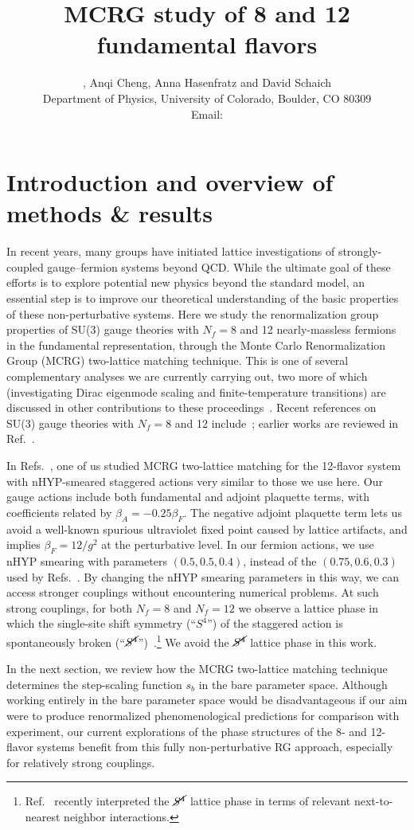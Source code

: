 \documentclass{PoS}
\title{MCRG study of 8 and 12 fundamental flavors}
\author{\speaker{Gregory Petropoulos}, Anqi Cheng, Anna Hasenfratz and David Schaich \\
  Department of Physics, University of Colorado, Boulder, CO 80309 \\
  Email: \email{gregory.petropoulos@colorado.edu}
}
\newcommand{\be}{\ensuremath{\beta} }
\newcommand{\Sb}{\ensuremath{\cancel{S^4}} }
\newcommand{\refcite}[1]{Ref.~\cite{#1}}
\begin{document}
\section{Introduction and overview of methods \& results} %
In recent years, many groups have initiated lattice investigations of strongly-coupled gauge--fermion systems beyond QCD.
While the ultimate goal of these efforts is to explore potential new physics beyond the standard model, an essential step is to improve our theoretical understanding of the basic properties of these non-perturbative systems.
Here we study the renormalization group properties of SU(3) gauge theories with $N_f = 8$ and 12 nearly-massless fermions in the fundamental representation, through the Monte Carlo Renormalization Group (MCRG) two-lattice matching technique.
This is one of several complementary analyses we are currently carrying out, two more of which (investigating Dirac eigenmode scaling and finite-temperature transitions) are discussed in other contributions to these proceedings~\cite{Hasenfratz:2012fp, Schaich:2012fr}.
Recent references on SU(3) gauge theories with $N_f = 8$ and 12 include~\cite{Fodor:2012uw, Fodor:2012et, Aoki:2012eq, Deuzeman:2012ee, Lin:2012iw}; earlier works are reviewed in \refcite{Giedt:2012LAT}.

In Refs.~\cite{Hasenfratz:2011xn, Hasenfratz:2011np}, one of us studied MCRG two-lattice matching for the 12-flavor system with nHYP-smeared staggered actions very similar to those we use here.
Our gauge actions include both fundamental and adjoint plaquette terms, with coefficients related by $\be_A = -0.25\be_F$.
The negative adjoint plaquette term lets us avoid a well-known spurious ultraviolet fixed point caused by lattice artifacts, and implies $\be_F = 12 / g^2$ at the perturbative level.
In our fermion actions, we use nHYP smearing with parameters $(0.5, 0.5, 0.4)$, instead of the $(0.75, 0.6, 0.3)$ used by Refs.~\cite{Hasenfratz:2011xn, Hasenfratz:2011np}.
By changing the nHYP smearing parameters in this way, we can access stronger couplings without encountering numerical problems.
At such strong couplings, for both $N_f = 8$ and $N_f = 12$ we observe a lattice phase in which the single-site shift symmetry (``$S^4$'') of the staggered action is spontaneously broken (``$\Sb$'')~\cite{Cheng:2011ic, Schaich:2012fr}.\footnote{\refcite{Deuzeman:2012ee} recently interpreted the \Sb lattice phase in terms of relevant next-to-nearest neighbor interactions.}
We avoid the \Sb lattice phase in this work.

In the next section, we review how the MCRG two-lattice matching technique determines the step-scaling function $s_b$ in the bare parameter space.
Although working entirely in the bare parameter space would be disadvantageous if our aim were to produce renormalized phenomenological predictions for comparison with experiment, our current explorations of the phase structures of the 8- and 12-flavor systems benefit from this fully non-perturbative RG approach, especially for relatively strong couplings.
\end{document}
